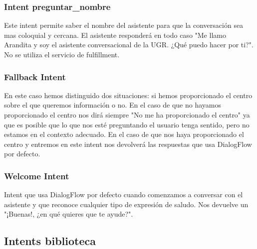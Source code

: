 \vspace{5 mm}

\subsubsection{Intent preguntar_nombre}

\vspace{5 mm}

Este intent permite saber el nombre del asistente para que la conversación sea mas coloquial y cercana. El asistente responderá en todo caso "Me llamo Arandita y soy el asistente conversacional de la UGR. ¿Qué puedo hacer por ti?". No se utiliza el servicio de fulfillment.

\vspace{5 mm}

\subsubsection{Fallback Intent}

\vspace{5 mm}

En este caso hemos distinguido dos situaciones: si hemos proporcionado el centro sobre el que queremos información o no. En el caso de que no hayamos proporcionado el centro nos dirá siempre "No me ha proporcionado el centro" ya que es posible que lo que nos esté preguntando el usuario tenga sentido, pero no estamos en el contexto adecuado. En el caso de que nos haya proporcionado el centro y entremos en este intent nos devolverá las respuestas que usa DialogFlow por defecto.

\vspace{5 mm}

\subsubsection{Welcome Intent}

\vspace{5 mm}

Intent que usa DialogFlow por defecto cuando comenzamos a conversar con el asistente y que reconoce cualquier tipo de expresión de saludo. Nos devuelve un "¡Buenas!, ¿en qué quieres que te ayude?".

\vspace{5 mm}

\subsection{Intents biblioteca}

